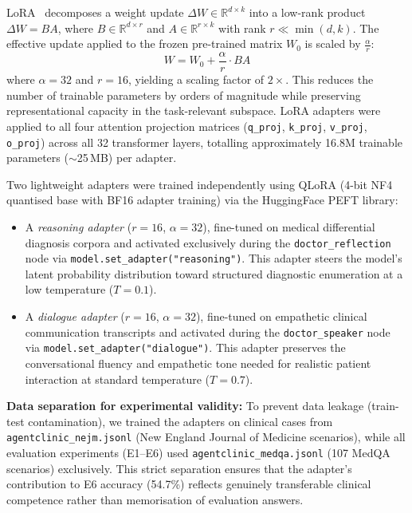 LoRA~\cite{hu2022lora} decomposes a weight update $\Delta W \in \mathbb{R}^{d \times k}$ into a low-rank product $\Delta W = BA$, where $B \in \mathbb{R}^{d \times r}$ and $A \in \mathbb{R}^{r \times k}$ with rank $r \ll \min(d, k)$. The effective update applied to the frozen pre-trained matrix $W_0$ is scaled by $\frac{\alpha}{r}$:
\begin{equation}
W = W_0 + \frac{\alpha}{r} \cdot BA
\end{equation}
where $\alpha = 32$ and $r = 16$, yielding a scaling factor of $2\times$. This reduces the number of trainable parameters by orders of magnitude while preserving representational capacity in the task-relevant subspace. LoRA adapters were applied to all four attention projection matrices (\texttt{q\_proj}, \texttt{k\_proj}, \texttt{v\_proj}, \texttt{o\_proj}) across all 32 transformer layers, totalling approximately 16.8M trainable parameters ($\sim$25\,MB) per adapter.

Two lightweight adapters were trained independently using QLoRA (4-bit NF4 quantised base with BF16 adapter training) via the HuggingFace PEFT library:
\begin{itemize}
    \item A \textit{reasoning adapter} ($r=16$, $\alpha=32$), fine-tuned on medical differential diagnosis corpora and activated exclusively during the \texttt{doctor\_reflection} node via \texttt{model.set\_adapter("reasoning")}. This adapter steers the model's latent probability distribution toward structured diagnostic enumeration at a low temperature ($T = 0.1$).
    \item A \textit{dialogue adapter} ($r=16$, $\alpha=32$), fine-tuned on empathetic clinical communication transcripts and activated during the \texttt{doctor\_speaker} node via \texttt{model.set\_adapter("dialogue")}. This adapter preserves the conversational fluency and empathetic tone needed for realistic patient interaction at standard temperature ($T = 0.7$).
\end{itemize}

\textbf{Data separation for experimental validity:} To prevent data leakage (train-test contamination), we trained the adapters on clinical cases from \texttt{agentclinic\_nejm.jsonl} (New England Journal of Medicine scenarios), while all evaluation experiments (E1--E6) used \texttt{agentclinic\_medqa.jsonl} (107 MedQA scenarios) exclusively. This strict separation ensures that the adapter's contribution to E6 accuracy (54.7\%) reflects genuinely transferable clinical competence rather than memorisation of evaluation answers.

